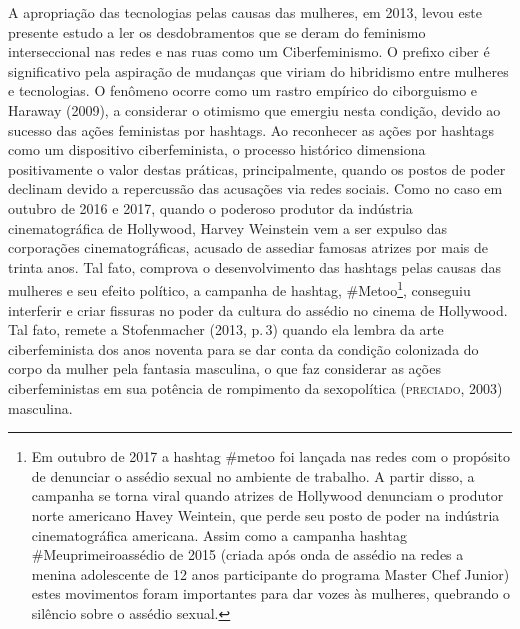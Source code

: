A apropriação das tecnologias pelas causas das mulheres, em 2013, levou
este presente estudo a ler os desdobramentos que se deram do feminismo
interseccional nas redes e nas ruas como um Ciberfeminismo. O prefixo
ciber é significativo pela aspiração de mudanças que viriam do
hibridismo entre mulheres e tecnologias. O fenômeno ocorre como um
rastro empírico do ciborguismo e Haraway (2009), a considerar o otimismo
que emergiu nesta condição, devido ao sucesso das ações feministas por
hashtags. Ao reconhecer as ações por hashtags como um dispositivo
ciberfeminista, o processo histórico dimensiona positivamente o valor
destas práticas, principalmente, quando os postos de poder declinam
devido a repercussão das acusações via redes sociais. Como no caso em
outubro de 2016 e 2017, quando o poderoso produtor da indústria
cinematográfica de Hollywood, Harvey Weinstein vem a ser expulso das
corporações cinematográficas, acusado de assediar famosas atrizes por
mais de trinta anos. Tal fato, comprova o desenvolvimento das hashtags
pelas causas das mulheres e seu efeito político, a campanha de hashtag,
\#Metoo\footnote{Em outubro de 2017 a hashtag \#metoo foi lançada nas
  redes com o propósito de denunciar o assédio sexual no ambiente de
  trabalho. A partir disso, a campanha se torna viral quando atrizes de
  Hollywood denunciam o produtor norte americano Havey Weintein, que
  perde seu posto de poder na indústria cinematográfica americana. Assim
  como a campanha hashtag \#Meuprimeiroassédio de 2015 (criada após onda
  de assédio na redes a menina adolescente de 12 anos participante do
  programa Master Chef Junior) estes movimentos foram importantes para
  dar vozes às mulheres, quebrando o silêncio sobre o assédio sexual.},
conseguiu interferir e criar fissuras no poder da cultura do assédio no
cinema de Hollywood. Tal fato, remete a Stofenmacher (2013, p.\,3) quando
ela lembra da arte ciberfeminista dos anos noventa para se dar conta da
condição colonizada do corpo da mulher pela fantasia masculina, o que
faz considerar as ações ciberfeministas em sua potência de rompimento da
sexopolítica (\textsc{preciado}, 2003) masculina.

